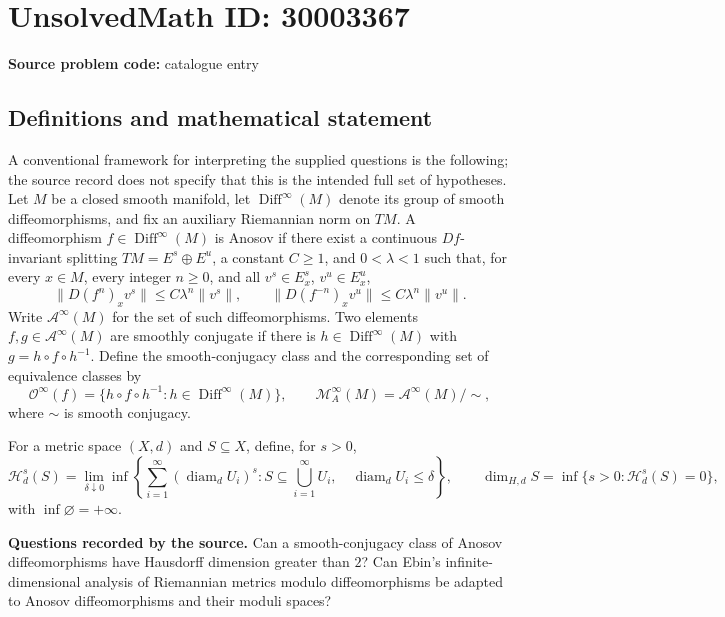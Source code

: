 \documentclass[11pt]{article}
\begin{document}
\section*{UnsolvedMath ID: 30003367}
\textbf{Source problem code:} catalogue entry
\subsection{Definitions and mathematical statement}
A conventional framework for interpreting the supplied questions is the following; the source record does not specify that this is the intended full set of hypotheses. Let \(M\) be a closed smooth manifold, let \(\operatorname{Diff}^{\infty}(M)\) denote its group of smooth diffeomorphisms, and fix an auxiliary Riemannian norm on \(TM\). A diffeomorphism \(f\in\operatorname{Diff}^{\infty}(M)\) is Anosov if there exist a continuous \(Df\)-invariant splitting \(TM=E^s\oplus E^u\), a constant \(C\geq 1\), and \(0<\lambda<1\) such that, for every \(x\in M\), every integer \(n\geq0\), and all \(v^s\in E_x^s\), \(v^u\in E_x^u\),
\[
\|D(f^n)_xv^s\|\leq C\lambda^n\|v^s\|,
\qquad
\|D(f^{-n})_xv^u\|\leq C\lambda^n\|v^u\|.
\]
Write \(\mathcal A^{\infty}(M)\) for the set of such diffeomorphisms. Two elements \(f,g\in\mathcal A^{\infty}(M)\) are smoothly conjugate if there is \(h\in\operatorname{Diff}^{\infty}(M)\) with \(g=h\circ f\circ h^{-1}\). Define the smooth-conjugacy class and the corresponding set of equivalence classes by
\[
\mathcal O^{\infty}(f)=\{h\circ f\circ h^{-1}:h\in\operatorname{Diff}^{\infty}(M)\},
\qquad
\mathcal M_A^{\infty}(M)=\mathcal A^{\infty}(M)/{\sim},
\]
where \(\sim\) is smooth conjugacy.

For a metric space \((X,d)\) and \(S\subseteq X\), define, for \(s>0\),
\[
\mathcal H_d^s(S)=\lim_{\delta\downarrow0}\inf\left\{
\sum_{i=1}^{\infty}(\operatorname{diam}_d U_i)^s:
S\subseteq\bigcup_{i=1}^{\infty}U_i,\quad
\operatorname{diam}_d U_i\leq\delta
\right\},
\qquad
\dim_{H,d}S=\inf\{s>0:\mathcal H_d^s(S)=0\},
\]
with \(\inf\varnothing=+\infty\).

\textbf{Questions recorded by the source.} Can a smooth-conjugacy class of Anosov diffeomorphisms have Hausdorff dimension greater than \(2\)? Can Ebin's infinite-dimensional analysis of Riemannian metrics modulo diffeomorphisms be adapted to Anosov diffeomorphisms and their moduli spaces?
\end{document}
